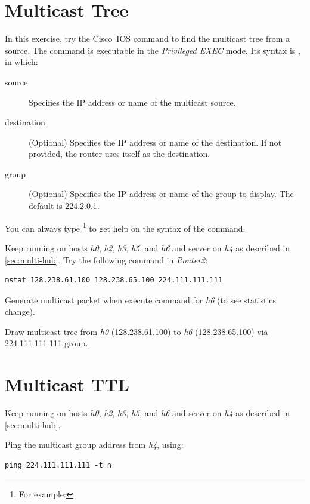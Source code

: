 \documentclass{../UTNetLab}
\begin{document}
\section{Multicast Tree}
In this exercise, try the  Cisco~IOS command to find the multicast tree from a source.
The  command is executable in the \textit{Privileged EXEC} mode.
Its syntax is , in which:
\begin{description}
    \item[source] Specifies the IP address or name of the multicast source.
    \item[destination] (Optional) Specifies the IP address or name of the destination. If not provided, the router uses itself as the destination.
    \item[group] (Optional) Specifies the IP address or name of the group to display. The default is 224.2.0.1.
\end{description}
You can always type \footnote{For example: } to get help on the syntax of the command.

Keep  running on hosts \textit{h0}, \textit{h2}, \textit{h3}, \textit{h5}, and \textit{h6} and server on \textit{h4} as described in \autoref{sec:multi-hub}.
Try the following command in \textit{Router2}:

\begin{lstlisting}
mstat 128.238.61.100 128.238.65.100 224.111.111.111
\end{lstlisting}

Generate multicast packet when execute command for \textit{h6} (to see statistics change).

\begin{report}
    \item Draw multicast tree from \textit{h0} (128.238.61.100) to \textit{h6} (128.238.65.100) via 224.111.111.111 group.
\end{report}

\section{Multicast TTL}
Keep  running on hosts \textit{h0}, \textit{h2}, \textit{h3}, \textit{h5}, and \textit{h6} and server on \textit{h4} as described in \autoref{sec:multi-hub}.

Ping the multicast group address from \textit{h4}, using:
\begin{lstlisting}[emph={n}]
ping 224.111.111.111 -t n
\end{lstlisting}
\end{document}
